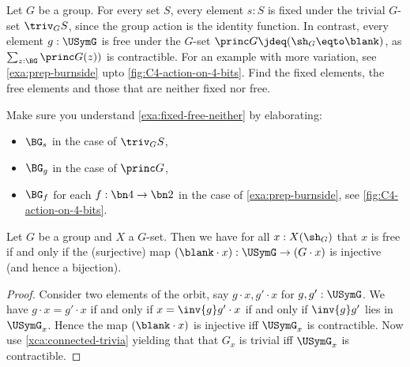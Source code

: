 \begin{example}\label{exa:fixed-free-neither}
Let $G$ be a group. For every set $S$, every element $s:S$ is fixed
under the trivial $G$-set $\triv_G S$, since the group action is the 
identity function. In contrast,
every element $g:\USymG$ is free under the $G$-set 
$\princ G \jdeq(\sh_G \eqto \blank)$, 
as $\sum_{z:\BG}\princ G(z))$ is contractible.
For an example with more variation, see \cref{exa:prep-burnside} upto
\cref{fig:C4-action-on-4-bits}. Find the fixed elements, the free elements
and those that are neither fixed nor free.
\end{example}

\begin{xca}\label{xca:fixed-free-neither}
Make sure you understand \cref{exa:fixed-free-neither} by
elaborating:
\begin{itemize}
\item $\BG_s$ in the case of $\triv_G S$,
\item $\BG_g$ in the case of $\princ G$, 
\item $\BG_f$ for each $f:\bn4\to\bn2$
in the case of \cref{exa:prep-burnside}, see \cref{fig:C4-action-on-4-bits}.
\end{itemize}
\end{xca}

\begin{lemma}\label{lem:free-pt-char}
  Let $G$ be a group and $X$ a $G$-set. Then we have for all $x:X(\sh_G)$
  that $x$ is free if and only if the (surjective) map
  $(\blank \cdot x) : \USymG \to (G\cdot x)$ is injective
  (and hence a bijection).
\end{lemma}
\begin{proof}
  Consider two elements of the orbit, say $g\cdot x,g'\cdot x$ for $g,g':\USymG$.
  We have $g\cdot x=g' \cdot x$ if and only if $x = \inv{g} g'\cdot x$
  if and only if $\inv{g} g'$ lies in $\USymG_x$.
  Hence the map $(\blank \cdot x)$ is injective iff $\USymG_x$ is contractible.
  Now use \cref{xca:connected-trivia} yielding that that 
  $G_x$ is trivial iff $\USymG_x$ is contractible.
\end{proof}

